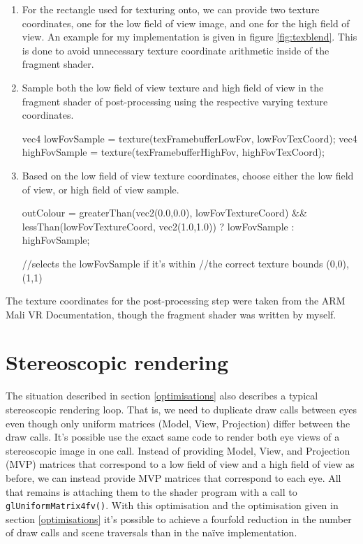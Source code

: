 \documentclass[12pt,a4paper,twoside,openright]{report}
\begin{document}
\begin{enumerate}
\item For the rectangle used for texturing onto, we can provide two texture coordinates, one for the low field of view image, and one for the high field of view. An example for my implementation is given in figure \ref{fig:texblend}. This is done to avoid unnecessary texture coordinate arithmetic inside of the fragment shader.
\item Sample both the low field of view texture and high field of view in the fragment shader of post-processing using the respective varying texture coordinates.
\begin{blockcode}
	vec4 lowFovSample = texture(texFramebufferLowFov, lowFovTexCoord);
	vec4 highFovSample = texture(texFramebufferHighFov, highFovTexCoord);
\end{blockcode}

\item Based on the low field of view texture coordinates, choose either the low field of view, or high field of view sample.

\begin{blockcode}	
	outColour = greaterThan(vec2(0.0,0.0), lowFovTextureCoord) && 
				lessThan(lowFovTextureCoord, vec2(1.0,1.0)) 
				? lowFovSample : highFovSample;

	//selects the lowFovSample if it's within 
	//the correct texture bounds (0,0), (1,1) 
\end{blockcode}
\end{enumerate}

The texture coordinates for the post-processing step were taken from the ARM Mali VR Documentation\cite{armDeveloper}, though the fragment shader was written by myself. 

\section{Stereoscopic rendering}

The situation described in section \ref{optimisations} also describes a typical stereoscopic rendering loop. That is, we need to duplicate draw calls between eyes even though only uniform matrices (Model, View, Projection) differ between the draw calls. It's possible use the exact same code to render both eye views of a stereoscopic image in one call. Instead of providing Model, View, and Projection (MVP) matrices that correspond to a low field of view and a high field of view as before, we can instead provide MVP matrices that correspond to each eye. All that remains is attaching them to the shader program with a call to \texttt{glUniformMatrix4fv()}. With this optimisation and the optimisation given in section \ref{optimisations} it's possible to achieve a fourfold reduction in the number of draw calls and scene traversals than in the na\"ive implementation.
\end{document}
